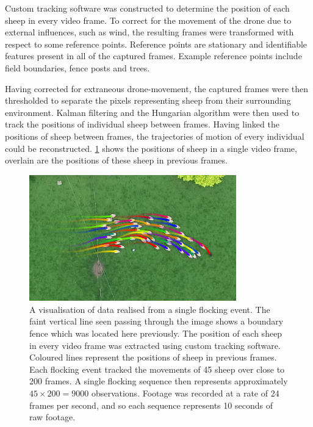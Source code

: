 Custom tracking software was constructed to determine the position of each
sheep in every video frame. To correct for the movement of the drone due to
external influences, such as wind, the resulting frames were transformed with
respect to some reference points. Reference points are stationary and
identifiable features present in all of the captured frames. Example reference
points include field boundaries, fence posts and trees.

Having corrected for extraneous drone-movement, the captured frames were then
thresholded to separate the pixels representing sheep from their surrounding
environment. Kalman filtering and the Hungarian algorithm were then used to
track the positions of individual sheep between frames. Having linked the
positions of sheep between frames, the trajectories of motion of every
individual could be reconstructed. \cref{fig:sheep_frame} shows the positions
of sheep in a single video frame, overlain are the positions of these sheep in
previous frames.

\begin{figure}[tbp]
  \includegraphics[width=0.8\textwidth]{traj0130_crop.png}
  \caption{A visualisation of data realised from a single flocking event. The
    faint vertical line seen passing through the image shows a boundary fence
    which was located here previously. The position of each sheep in every
    video frame was extracted using custom tracking software. Coloured lines
    represent the positions of sheep in previous frames. Each flocking event
    tracked the movements of 45 sheep over close to 200 frames. A single
    flocking sequence then represents approximately $45\times200=9000$
    observations. Footage was recorded at a rate of 24 frames per second, and so
    each sequence represents 10 seconds of raw footage.}
  \label{fig:sheep_frame}
\end{figure}

